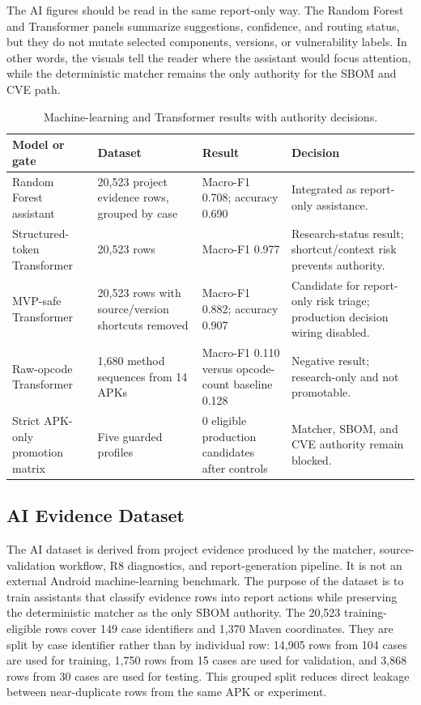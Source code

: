 The AI figures should be read in the same report-only way. The Random Forest
and Transformer panels summarize suggestions, confidence, and routing status,
but they do not mutate selected components, versions, or vulnerability labels.
In other words, the visuals tell the reader where the assistant would focus
attention, while the deterministic matcher remains the only authority for the
SBOM and CVE path.

\begin{table}[H]
\centering
\caption{Machine-learning and Transformer results with authority decisions.}
\label{tab:pfe-ai-results}
\begin{tabularx}{\textwidth}{L{0.25\textwidth}L{0.22\textwidth}L{0.19\textwidth}X}
\toprule
\textbf{Model or gate} & \textbf{Dataset} & \textbf{Result} &
\textbf{Decision}\\
\midrule
Random Forest assistant & 20,523 project evidence rows, grouped by case &
Macro-F1 0.708; accuracy 0.690 & Integrated as report-only assistance.\\
Structured-token Transformer & 20,523 rows & Macro-F1 0.977 &
Research-status result; shortcut/context risk prevents authority.\\
MVP-safe Transformer & 20,523 rows with source/version shortcuts removed &
Macro-F1 0.882; accuracy 0.907 & Candidate for report-only risk triage;
production decision wiring disabled.\\
Raw-opcode Transformer & 1,680 method sequences from 14 APKs & Macro-F1 0.110
versus opcode-count baseline 0.128 & Negative result; research-only and not
promotable.\\
Strict APK-only promotion matrix & Five guarded profiles & 0 eligible
production candidates after controls & Matcher, SBOM, and CVE authority
remain blocked.\\
\bottomrule
\end{tabularx}
\end{table}

\subsection{AI Evidence Dataset}

The AI dataset is derived from project evidence produced by the matcher,
source-validation workflow, R8 diagnostics, and report-generation pipeline. It
is not an external Android machine-learning benchmark. The purpose of the
dataset is to train assistants that classify evidence rows into report actions
while preserving the deterministic matcher as the only SBOM authority. The
20,523 training-eligible rows cover 149 case identifiers and 1,370 Maven
coordinates. They are split by case identifier rather than by individual row:
14,905 rows from 104 cases are used for training, 1,750 rows from 15 cases are
used for validation, and 3,868 rows from 30 cases are used for testing. This
grouped split reduces direct leakage between near-duplicate rows from the same
APK or experiment.

